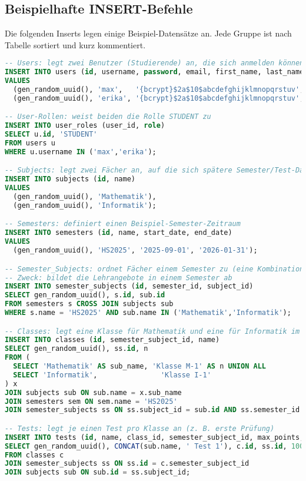 \documentclass[12pt,a4paper]{article}
\begin{document}
    \subsection{Beispielhafte INSERT-Befehle}
    \noindent Die folgenden Inserts legen einige Beispiel-Datensätze an. Jede Gruppe ist nach Tabelle sortiert und kurz kommentiert.
    \begin{lstlisting}[language=SQL]
-- Users: legt zwei Benutzer (Studierende) an, die sich anmelden können
INSERT INTO users (id, username, password, email, first_name, last_name, active, created_at, updated_at)
VALUES
  (gen_random_uuid(), 'max',   '{bcrypt}$2a$10$abcdefghijklmnopqrstuv', 'max@uni.de',   'Max',   'Mustermann', true, now(), now()),
  (gen_random_uuid(), 'erika', '{bcrypt}$2a$10$abcdefghijklmnopqrstuv', 'erika@uni.de', 'Erika', 'Musterfrau', true, now(), now());

-- User-Rollen: weist beiden die Rolle STUDENT zu
INSERT INTO user_roles (user_id, role)
SELECT u.id, 'STUDENT'
FROM users u
WHERE u.username IN ('max','erika');

-- Subjects: legt zwei Fächer an, auf die sich spätere Semester/Test-Daten beziehen
INSERT INTO subjects (id, name)
VALUES
  (gen_random_uuid(), 'Mathematik'),
  (gen_random_uuid(), 'Informatik');

-- Semesters: definiert einen Beispiel-Semester-Zeitraum
INSERT INTO semesters (id, name, start_date, end_date)
VALUES
  (gen_random_uuid(), 'HS2025', '2025-09-01', '2026-01-31');

-- Semester_Subjects: ordnet Fächer einem Semester zu (eine Kombination pro Zeile)
-- Zweck: bildet die Lehrangebote in einem Semester ab
INSERT INTO semester_subjects (id, semester_id, subject_id)
SELECT gen_random_uuid(), s.id, sub.id
FROM semesters s CROSS JOIN subjects sub
WHERE s.name = 'HS2025' AND sub.name IN ('Mathematik','Informatik');

-- Classes: legt eine Klasse für Mathematik und eine für Informatik im Semester HS2025 an
INSERT INTO classes (id, semester_subject_id, name)
SELECT gen_random_uuid(), ss.id, n
FROM (
  SELECT 'Mathematik' AS sub_name, 'Klasse M-1' AS n UNION ALL
  SELECT 'Informatik',               'Klasse I-1'
) x
JOIN subjects sub ON sub.name = x.sub_name
JOIN semesters sem ON sem.name = 'HS2025'
JOIN semester_subjects ss ON ss.subject_id = sub.id AND ss.semester_id = sem.id;

-- Tests: legt je einen Test pro Klasse an (z. B. erste Prüfung)
INSERT INTO tests (id, name, class_id, semester_subject_id, max_points, date)
SELECT gen_random_uuid(), CONCAT(sub.name, ' Test 1'), c.id, ss.id, 100.00, '2025-10-15'
FROM classes c
JOIN semester_subjects ss ON ss.id = c.semester_subject_id
JOIN subjects sub ON sub.id = ss.subject_id;


\end{lstlisting}
\end{document}
